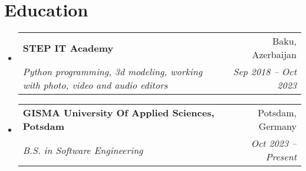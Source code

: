 \documentclass[letterpaper,10pt]{article}
\makeatletter
\newcommand{\resumeSubheading}[4]{
\vspace{-1pt}\item
  \begin{tabular*}{0.97\textwidth}[t]{l@{\extracolsep{\fill}}r}
    \textbf{#1} & #2 \\
    \textit{#3} & \textit{#4} \\
  \end{tabular*}\vspace{-7pt}
}
\newcommand{\resumeSubHeadingList}{\begin{itemize}[leftmargin=0.15in, label={}]}
\newcommand{\resumeSubHeadingListEnd}{\end{itemize}}
\makeatother
\begin{document}
\section{Education}
\resumeSubHeadingList
  \resumeSubheading
      {STEP IT Academy}{Baku, Azerbaijan}
      {Python programming, 3d modeling, working with photo, video and audio editors}{Sep 2018 -- Oct 2023}
  \resumeSubheading
      {GISMA University Of Applied Sciences, Potsdam}{Potsdam, Germany}
      {B.S. in Software Engineering}{Oct 2023 -- Present}
\resumeSubHeadingListEnd
\end{document}
